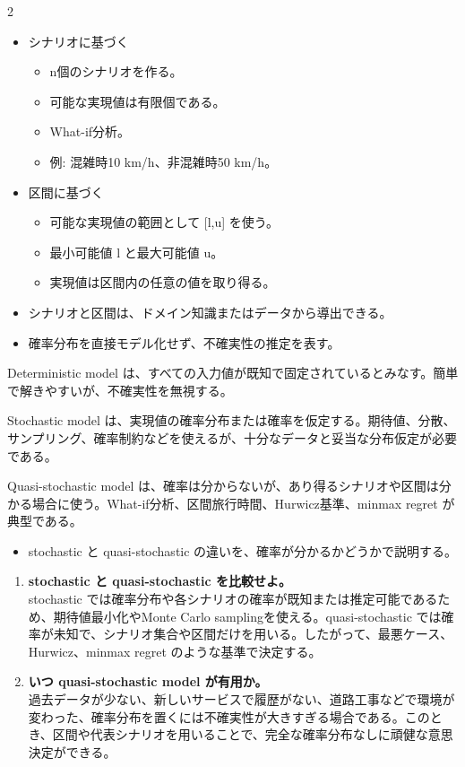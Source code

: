 \clearpage
{}
\begin{multicols}{2}\footnotesize\raggedcolumns
{}
\begin{itemize}
\item シナリオに基づく
\begin{itemize}
\item n個のシナリオを作る。
\item 可能な実現値は有限個である。
\item What-if分析。
\item 例: 混雑時10 km/h、非混雑時50 km/h。
\end{itemize}
\item 区間に基づく
\begin{itemize}
\item 可能な実現値の範囲として [l,u] を使う。
\item 最小可能値 l と最大可能値 u。
\item 実現値は区間内の任意の値を取り得る。
\end{itemize}
\item シナリオと区間は、ドメイン知識またはデータから導出できる。
\item 確率分布を直接モデル化せず、不確実性の推定を表す。
\end{itemize}
Deterministic model は、すべての入力値が既知で固定されているとみなす。簡単で解きやすいが、不確実性を無視する。\par

Stochastic model は、実現値の確率分布または確率を仮定する。期待値、分散、サンプリング、確率制約などを使えるが、十分なデータと妥当な分布仮定が必要である。\par

Quasi-stochastic model は、確率は分からないが、あり得るシナリオや区間は分かる場合に使う。What-if分析、区間旅行時間、Hurwicz基準、minmax regret が典型である。\par
{}
\begin{itemize}
\item stochastic と quasi-stochastic の違いを、確率が分かるかどうかで説明する。
\end{itemize}
\begin{enumerate}
\item \textbf{stochastic と quasi-stochastic を比較せよ。}\\stochastic では確率分布や各シナリオの確率が既知または推定可能であるため、期待値最小化やMonte Carlo samplingを使える。quasi-stochastic では確率が未知で、シナリオ集合や区間だけを用いる。したがって、最悪ケース、Hurwicz、minmax regret のような基準で決定する。
\item \textbf{いつ quasi-stochastic model が有用か。}\\過去データが少ない、新しいサービスで履歴がない、道路工事などで環境が変わった、確率分布を置くには不確実性が大きすぎる場合である。このとき、区間や代表シナリオを用いることで、完全な確率分布なしに頑健な意思決定ができる。
\end{enumerate}
\end{multicols}

